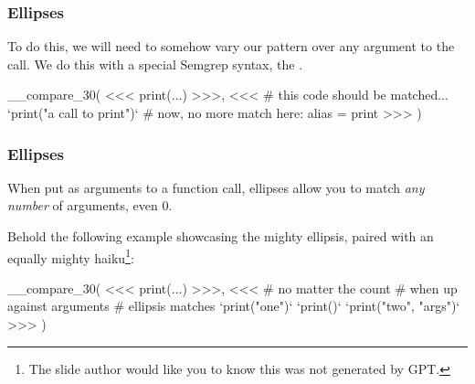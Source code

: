 \documentclass[aspectratio=169, handout]{beamer}
\begin{document}
\begin{frame}[fragile]
  \frametitle{Ellipses}

  To do this, we will need to somehow vary our pattern over any argument to the
  call. We do this with a special Semgrep syntax, the .

  \pause
  \vspace{\fill}


  \pause
  \vspace{\fill}

__compare_30(
<<<
  print(...)
>>>,
<<<
  # this code should be matched...
  `print("a call to print")`
  # now, no more match here:
  alias = print
>>>
)

  \pause
  \vspace{\fill}

\end{frame}

\begin{frame}[fragile]
  \frametitle{Ellipses}

  When put as arguments to a function call, ellipses allow you to match \textit{any number}
  of arguments, even 0.

  \pause
  \vspace{\fill}

  Behold the following example showcasing the mighty ellipsis, paired with an equally
  mighty haiku\footnote{The slide author would like you to know this was not generated by GPT.}:

  \vspace{\fill}

__compare_30(
<<<
  print(...)
>>>,
<<<
  # no matter the count
  # when up against arguments
  # ellipsis matches
  `print("one")`
  `print()`
  `print("two", "args")`
>>>
)
\end{frame}
\end{document}
